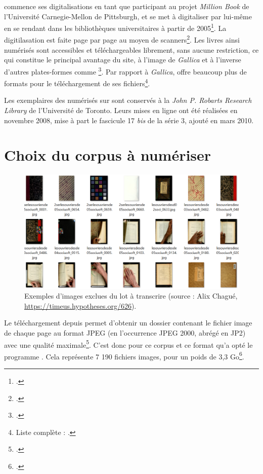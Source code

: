 \ia{} commence ses digitalisations en tant que participant au projet \textit{Million Book} de l'Université Carnegie-Mellon de Pittsburgh, et se met à digitaliser par lui-même en se rendant dans les bibliothèques universitaires à partir de 2005\footcite[p. 4]{Brewster2}. La digitilasation est faite page par page au moyen de scanners\footcite[p. 4]{Brewster2}. Les livres ainsi numérisés sont accessibles  et téléchargeables librement, sans aucune restriction, ce qui constitue le principal avantage du site, à l'image de \textit{Gallica} et à l'inverse d'autres plates-formes comme \gb\footcite[p. 1]{Brewster2}. Par rapport à \textit{Gallica}, \ia{} offre beaucoup plus de formats pour le téléchargement de ses fichiers\footnote{Liste complète : \cite[p. 33]{chague}.}.

Les exemplaires des \odm{} numérisés sur \ia{} sont conservés à la \textit{John P. Robarts Research Library} de l'Université de Toronto. Leurs mises en ligne ont été réalisées en novembre 2008, mise à part le fascicule 17 \textit{bis} de la série 3, ajouté en mars 2010.

\section{Choix du corpus à numériser}

\begin{figure}[h]
    \centering
    \includegraphics[width=15cm]{img/ex_tri.png}
    \caption[Images exclues du lot à transcrire]{Exemples d'images exclues du lot à transcrire (source : Alix Chagué, \url{https://timeus.hypotheses.org/626}).}
    \label{fig:ex_tri}
\end{figure}

Le téléchargement depuis \ia{} permet d'obtenir un dossier contenant le fichier image de chaque page au format JPEG (en l'occurrence JPEG 2000, abrégé en JP2) avec une qualité maximale\footcite{chague2}. C'est donc pour ce corpus et ce format qu'a opté le programme \timeus. Cela représente 7 190 fichiers images, pour un poids de 3,3 Go\footcite{chague2}.

